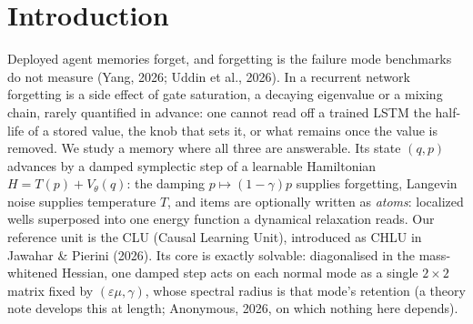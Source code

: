 \begin{abstract}
A memory that forgets is only useful if you can say \emph{how fast}, \emph{why}, and \emph{what is actually gone}. In a physics-structured recurrent memory --- a damped symplectic step of a learned Hamiltonian --- forgetting is a budget in three numbers: the spectral mass $\mu$ of the stored direction, the damping $\gamma$ and the temperature $T$. The headline is a damping optimum: retention half-life is non-monotone in friction, one V-curve minimized at $\gamma_{\rm crit}=2\varepsilon\mu$ ($\propto\mu^{-2}$ overdamped, a mass-independent floor underdamped), spanning $\approx11$ orders of magnitude in $\mu^2$, holding on emergent (learned-MLP) as well as designed units, 3/3 seeds (dim 4, hidden 64, laptop-CPU), and reproduced by direct nonlinear rollout with the argmin agreeing to $0.35\%$. Hence at $T>0$ friction preserves and temperature erases, and a localized friction hole is a memory vault: $107.77\pm4.78\times$ designed, $106.1\pm5.0\times$ law-referenced on emergent (3 seeds each), though the field-versus-scalar contrast naming its mechanism is designed-only. Removal is structural: under canonical placement --- Blelloch \& Golovin's (FOCS'07) --- store-level deletion is exact, the post-deletion store byte-identical at every load measured to the store that never held the item, under three stated conditions (\texttt{budget >= n\_cells}, \texttt{leak = 0}, priority/attribute eviction; recency eviction excluded), on a designed store of dim 3, capacity 8--64, no learning. We state what decay does \emph{not} buy: the store stops answering before it stops leaking.
\end{abstract}

\section{Introduction}\label{sec:intro}

Deployed agent memories forget, and forgetting is the failure mode benchmarks do not measure (Yang, 2026; Uddin et al., 2026). In a recurrent network forgetting is a side effect of gate saturation, a decaying eigenvalue or a mixing chain, rarely quantified in advance: one cannot read off a trained LSTM the half-life of a stored value, the knob that sets it, or what remains once the value is removed. We study a memory where all three are answerable. Its state $(q,p)$ advances by a damped symplectic step of a learnable Hamiltonian $H=T(p)+V_\theta(q)$: the damping $p\mapsto(1-\gamma)p$ supplies forgetting, Langevin noise supplies temperature $T$, and items are optionally written as \emph{atoms}: localized wells superposed into one energy function a dynamical relaxation reads. Our reference unit is the CLU (Causal Learning Unit), introduced as CHLU in Jawahar \& Pierini (2026). Its core is exactly solvable: diagonalised in the mass-whitened Hessian, one damped step acts on each normal mode as a single $2\times2$ matrix fixed by $(\varepsilon\mu,\gamma)$, whose spectral radius is that mode's retention (a theory note develops this at length; Anonymous, 2026, on which nothing here depends).

